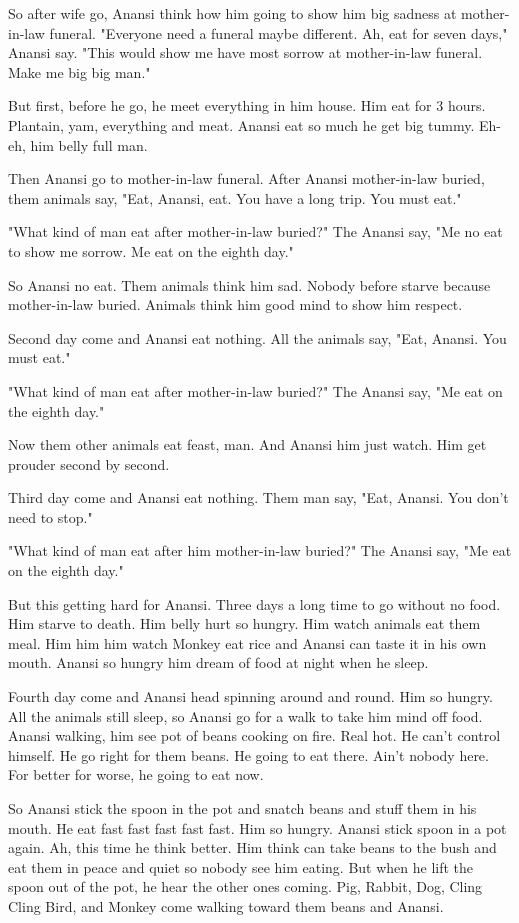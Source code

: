 So after wife go, Anansi think how him going to show him big sadness at mother-in-law funeral. "Everyone need a funeral maybe different. Ah, eat for seven days," Anansi say. "This would show me have most sorrow at mother-in-law funeral. Make me big big man."

But first, before he go, he meet everything in him house. Him eat for 3 hours. Plantain, yam, everything and meat. Anansi eat so much he get big tummy. Eh-eh, him belly full man.

Then Anansi go to mother-in-law funeral. After Anansi mother-in-law buried, them animals say, "Eat, Anansi, eat. You have a long trip. You must eat."

"What kind of man eat after mother-in-law buried?" The Anansi say, "Me no eat to show me sorrow. Me eat on the eighth day."

So Anansi no eat. Them animals think him sad. Nobody before starve because mother-in-law buried. Animals think him good mind to show him respect.

Second day come and Anansi eat nothing. All the animals say, "Eat, Anansi. You must eat."

"What kind of man eat after mother-in-law buried?" The Anansi say, "Me eat on the eighth day."

Now them other animals eat feast, man. And Anansi him just watch. Him get prouder second by second.

Third day come and Anansi eat nothing. Them man say, "Eat, Anansi. You don't need to stop."

"What kind of man eat after him mother-in-law buried?" The Anansi say, "Me eat on the eighth day."

But this getting hard for Anansi. Three days a long time to go without no food. Him starve to death. Him belly hurt so hungry. Him watch animals eat them meal. Him him him watch Monkey eat rice and Anansi can taste it in his own mouth. Anansi so hungry him dream of food at night when he sleep.

Fourth day come and Anansi head spinning around and round. Him so hungry. All the animals still sleep, so Anansi go for a walk to take him mind off food. Anansi walking, him see pot of beans cooking on fire. Real hot. He can't control himself. He go right for them beans. He going to eat there. Ain't nobody here. For better for worse, he going to eat now.

So Anansi stick the spoon in the pot and snatch beans and stuff them in his mouth. He eat fast fast fast fast fast. Him so hungry. Anansi stick spoon in a pot again. Ah, this time he think better. Him think can take beans to the bush and eat them in peace and quiet so nobody see him eating. But when he lift the spoon out of the pot, he hear the other ones coming. Pig, Rabbit, Dog, Cling Cling Bird, and Monkey come walking toward them beans and Anansi.

